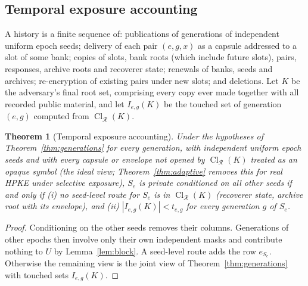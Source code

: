 \documentclass[pdflatex,sn-mathphys-num]{sn-jnl}
\theoremstyle{plain}
\newtheorem{theorem}{Theorem}
\theoremstyle{definition}
\newcommand{\Cl}{\operatorname{Cl}}
\begin{document}
\subsection{Temporal exposure accounting}
A history is a finite sequence of: publications of generations of independent uniform epoch seeds; delivery of each pair $(e,g,x)$ as a capsule addressed to a slot of some bank; copies of slots, bank roots (which include future slots), pairs, responses, archive roots and recoverer state; renewals of banks, seeds and archives; re-encryption of existing pairs under new slots; and deletions. Let $K$ be the adversary's final root set, comprising every copy ever made together with all recorded public material, and let $I_{e,g}(K)$ be the touched set of generation $(e,g)$ computed from $\Cl_{\mathcal R}(K)$.

\begin{theorem}[Temporal exposure accounting]\label{thm:temporal}
Under the hypotheses of Theorem~\ref{thm:generations} for every generation, with independent uniform epoch seeds and with every capsule or envelope not opened by $\Cl_{\mathcal R}(K)$ treated as an opaque symbol (the ideal view; Theorem~\ref{thm:adaptive} removes this for real HPKE under selective exposure), $S_e$ is private conditioned on all other seeds if and only if (i) no seed-level route for $S_e$ is in $\Cl_{\mathcal R}(K)$ (recoverer state, archive root with its envelope), and (ii) $|I_{e,g}(K)|<t_{e,g}$ for every generation $g$ of $S_e$.
\end{theorem}
\begin{proof}
Conditioning on the other seeds removes their columns. Generations of other epochs then involve only their own independent masks and contribute nothing to $U$ by Lemma~\ref{lem:block}. A seed-level route adds the row $e_{S_e}$. Otherwise the remaining view is the joint view of Theorem~\ref{thm:generations} with touched sets $I_{e,g}(K)$.
\end{proof}
\end{document}
